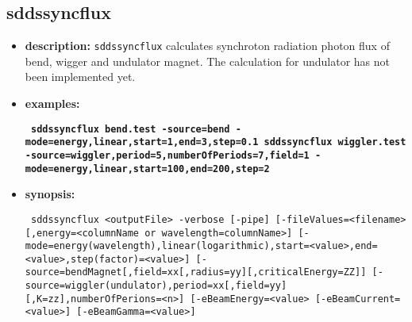 \begin{latexonly}
\newpage
\end{latexonly}
\subsection{sddssyncflux}
\label{sddssyncflux}

\begin{itemize}
\item {\bf description:} \verb|sddssyncflux| calculates synchroton radiation photon flux of bend, wigger and undulator magnet. The calculation for undulator has not been implemented yet.

\item {\bf examples:} 
%
% 
%
{\tt }
\begin{flushleft}{\tt
\bf sddssyncflux bend.test -source=bend -mode=energy,linear,start=1,end=3,step=0.1
\bf sddssyncflux wiggler.test -source=wiggler,period=5,numberOfPeriods=7,field=1 -mode=energy,linear,start=100,end=200,step=2 
}\end{flushleft}

\item {\bf synopsis:} 
%
%
\begin{flushleft}{\tt
sddssyncflux <outputFile> -verbose [-pipe]
   [-fileValues=<filename>[,energy=<columnName or wavelength=columnName>] 
   [-mode=energy(wavelength),linear(logarithmic),start=<value>,end=<value>,step(factor)=<value>] 
   [-source=bendMagnet[,field=xx[,radius=yy][,criticalEnergy=ZZ]] 
     [-source=wiggler(undulator),period=xx[,field=yy][,K=zz],numberOfPerions=<n>]
   [-eBeamEnergy=<value> [-eBeamCurrent=<value>] [-eBeamGamma=<value>]   
}\end{flushleft}


\end{itemize}
